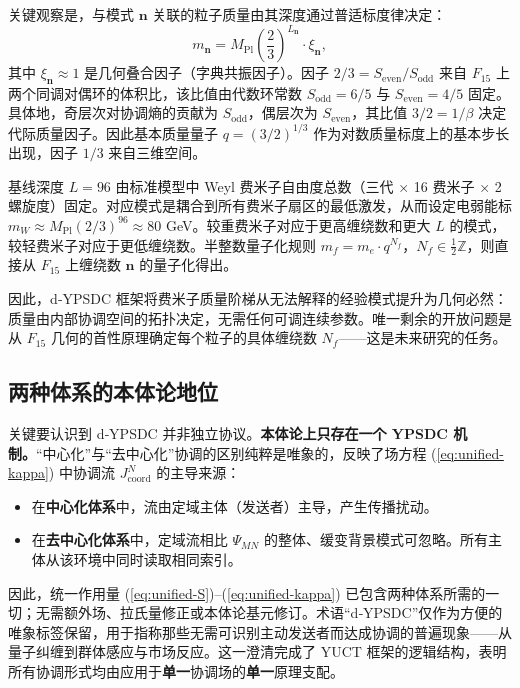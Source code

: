 \documentclass[12pt,a4paper]{article}
\begin{document}
	关键观察是，与模式 \(\mathbf{n}\) 关联的粒子质量由其深度通过普适标度律决定：
	\begin{equation}
		m_{\mathbf{n}} = M_{\mathrm{Pl}} \left( \frac{2}{3} \right)^{L_{\mathbf{n}}} \cdot \xi_{\mathbf{n}},
		\label{eq:mass-L}
	\end{equation}
	其中 \(\xi_{\mathbf{n}} \approx 1\) 是几何叠合因子（字典共振因子）。因子 \(2/3 = S_{\mathrm{even}}/S_{\mathrm{odd}}\) 来自 \(F_{15}\) 上两个同调对偶环的体积比，该比值由代数环常数 \(S_{\mathrm{odd}}=6/5\) 与 \(S_{\mathrm{even}}=4/5\) 固定。具体地，奇层次对协调熵的贡献为 \(S_{\mathrm{odd}}\)，偶层次为 \(S_{\mathrm{even}}\)，其比值 \(3/2 = 1/\beta\) 决定代际质量因子。因此基本质量量子 \(q = (3/2)^{1/3}\) 作为对数质量标度上的基本步长出现，因子 \(1/3\) 来自三维空间。
	
	基线深度 \(L=96\) 由标准模型中 Weyl 费米子自由度总数（三代 × 16 费米子 × 2 螺旋度）固定。对应模式是耦合到所有费米子扇区的最低激发，从而设定电弱能标 \(m_W \approx M_{\mathrm{Pl}} (2/3)^{96} \approx 80\) GeV。较重费米子对应于更高缠绕数和更大 \(L\) 的模式，较轻费米子对应于更低缠绕数。半整数量子化规则 \(m_f = m_e \cdot q^{N_f}\)，\(N_f \in \frac{1}{2}\mathbb{Z}\)，则直接从 \(F_{15}\) 上缠绕数 \(\mathbf{n}\) 的量子化得出。
	
	因此，d‑YPSDC 框架将费米子质量阶梯从无法解释的经验模式提升为几何必然：质量由内部协调空间的拓扑决定，无需任何可调连续参数。唯一剩余的开放问题是从 \(F_{15}\) 几何的首性原理确定每个粒子的具体缠绕数 \(N_f\)——这是未来研究的任务。
	
	\subsection{两种体系的本体论地位}
	\label{subsec:ontological-status}
	
	关键要认识到 d‑YPSDC 并非独立协议。\textbf{本体论上只存在一个 YPSDC 机制。}“中心化”与“去中心化”协调的区别纯粹是唯象的，反映了场方程 (\ref{eq:unified-kappa}) 中协调流 \(J^{N}_{\mathrm{coord}}\) 的主导来源：
	
	\begin{itemize}[leftmargin=*]
		\item 在\textbf{中心化体系}中，流由定域主体（发送者）主导，产生传播扰动。
		\item 在\textbf{去中心化体系}中，定域流相比 \(\Psi_{MN}\) 的整体、缓变背景模式可忽略。所有主体从该环境中同时读取相同索引。
	\end{itemize}
	
	因此，统一作用量 (\ref{eq:unified-S})--(\ref{eq:unified-kappa}) 已包含两种体系所需的一切；无需额外场、拉氏量修正或本体论基元修订。术语“d‑YPSDC”仅作为方便的唯象标签保留，用于指称那些无需可识别主动发送者而达成协调的普遍现象——从量子纠缠到群体感应与市场反应。这一澄清完成了 YUCT 框架的逻辑结构，表明所有协调形式均由应用于\textbf{单一}协调场的\textbf{单一}原理支配。
	
\end{document}
